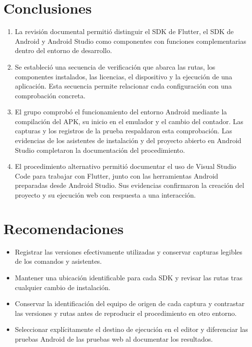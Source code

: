 \documentclass[12pt,letterpaper]{article}
\begin{document}
\section{Conclusiones}
\begin{enumerate}[leftmargin=*]
\item La revisión documental permitió distinguir el SDK de Flutter, el SDK de Android y Android Studio como componentes con funciones complementarias dentro del entorno de desarrollo.
\item Se estableció una secuencia de verificación que abarca las rutas, los componentes instalados, las licencias, el dispositivo y la ejecución de una aplicación. Esta secuencia permite relacionar cada configuración con una comprobación concreta.
\item El grupo comprobó el funcionamiento del entorno Android mediante la compilación del APK, su inicio en el emulador y el cambio del contador. Las capturas y los registros de la prueba respaldaron esta comprobación. Las evidencias de los asistentes de instalación y del proyecto abierto en Android Studio completaron la documentación del procedimiento.
\item El procedimiento alternativo permitió documentar el uso de Visual Studio Code para trabajar con Flutter, junto con las herramientas Android preparadas desde Android Studio. Sus evidencias confirmaron la creación del proyecto y su ejecución web con respuesta a una interacción.
\end{enumerate}

\section{Recomendaciones}
\begin{itemize}[leftmargin=*]
\item Registrar las versiones efectivamente utilizadas y conservar capturas legibles de los comandos y asistentes.
\item Mantener una ubicación identificable para cada SDK y revisar las rutas tras cualquier cambio de instalación.
\item Conservar la identificación del equipo de origen de cada captura y contrastar las versiones y rutas antes de reproducir el procedimiento en otro entorno.
\item Seleccionar explícitamente el destino de ejecución en el editor y diferenciar las pruebas Android de las pruebas web al documentar los resultados.
\end{itemize}
\end{document}
